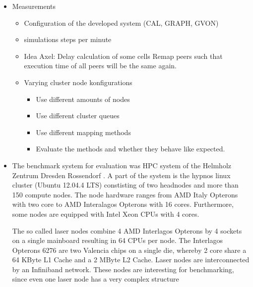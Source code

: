 \begin{itemize}
\item Measurements
  \begin{itemize}
  \item Configuration of the developed system (CAL, GRAPH, GVON)
  \item simulations steps per minute
  \item Idea Axel: Delay calculation of some cells
    Remap peers such that execution time of all peers
    will be the same again.
  \item Varying cluster node konfigurations
    \begin{itemize}
    \item Use different amounts of nodes
    \item Use different cluster queues
    \item Use different mapping methods
    \item Evaluate the methods and whether they
      behave like expected.
    \end{itemize}
  \end{itemize}

\item The benchmark system for evaluation was HPC system of the
  Helmholz Zentrum Dresden Rossendorf \cite{ref:hzdr_cluster}.  A part
  of the system is the hypnos linux cluster (Ubuntu 12.04.4 LTS)
  constisting of two headnodes and more than 150 compute nodes. The
  node hardware ranges from AMD Italy Opterons with two core to AMD
  Interalagos Opterons with 16 cores. Furthermore, some nodes are
  equipped with Intel Xeon CPUs with 4 cores.

  The so called laser nodes combine 4 AMD Interlagos Opterons by 4
  sockets on a single mainboard resulting in 64 CPUs per node.  The
  Interlagos Opterons 6276 are two Valencia chips on a single die,
  whereby 2 core share a 64 KByte L1 Cache and a 2 MByte L2
  Cache. Laser nodes are interconnected by an Infiniband
  network. These nodes are interesting for benchmarking, since even
  one laser node has a very complex structure




\end{itemize}
